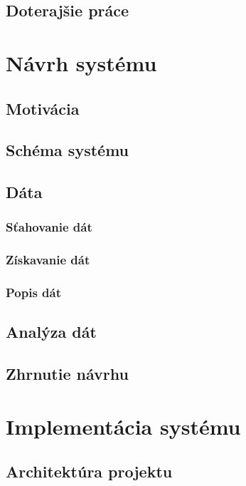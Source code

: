 \section{Doterajšie práce}


\chapter{Návrh systému} 
\label{navrh}

\section{Motivácia}


\section{Schéma systému}


\section{Dáta}

\subsection{Sťahovanie dát}

\subsection{Získavanie dát}

\subsection{Popis dát}


\section{Analýza dát}


\section{Zhrnutie návrhu}


\chapter{Implementácia systému}
\label{implementacia}

\section{Architektúra projektu}


